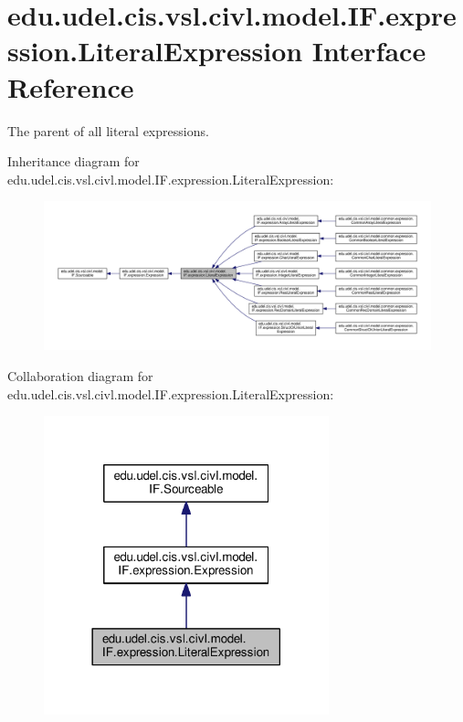 \hypertarget{interfaceedu_1_1udel_1_1cis_1_1vsl_1_1civl_1_1model_1_1IF_1_1expression_1_1LiteralExpression}{}\section{edu.\+udel.\+cis.\+vsl.\+civl.\+model.\+I\+F.\+expression.\+Literal\+Expression Interface Reference}
\label{interfaceedu_1_1udel_1_1cis_1_1vsl_1_1civl_1_1model_1_1IF_1_1expression_1_1LiteralExpression}


The parent of all literal expressions.  




Inheritance diagram for edu.\+udel.\+cis.\+vsl.\+civl.\+model.\+I\+F.\+expression.\+Literal\+Expression\+:
\nopagebreak
\begin{figure}[H]
\begin{center}
\leavevmode
\includegraphics[width=350pt]{interfaceedu_1_1udel_1_1cis_1_1vsl_1_1civl_1_1model_1_1IF_1_1expression_1_1LiteralExpression__inherit__graph}
\end{center}
\end{figure}


Collaboration diagram for edu.\+udel.\+cis.\+vsl.\+civl.\+model.\+I\+F.\+expression.\+Literal\+Expression\+:
\nopagebreak
\begin{figure}[H]
\begin{center}
\leavevmode
\includegraphics[width=234pt]{interfaceedu_1_1udel_1_1cis_1_1vsl_1_1civl_1_1model_1_1IF_1_1expression_1_1LiteralExpression__coll__graph}
\end{center}
\end{figure}
